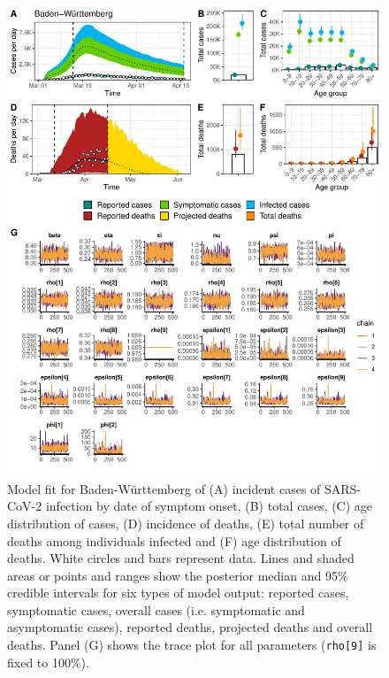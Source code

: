 \documentclass{article}
\begin{document}
\begin{figure}[h]
	\centering
	\includegraphics[width=\linewidth]{../format_output/figures_v3/supp_fit_badenw.pdf}
	\caption{Model fit for Baden-Württemberg of (A) incident cases of SARS-CoV-2 infection by date of symptom onset, (B) total cases, (C) age distribution of cases, (D) incidence of deaths, (E) total number of deaths among individuals infected and (F) age distribution of deaths. White circles and bars represent data. Lines and shaded areas or points and ranges show the posterior median and 95\% credible intervals for six types of model output: reported cases, symptomatic cases, overall cases (i.e. symptomatic and asymptomatic cases), reported deaths, projected deaths and overall deaths. Panel (G) shows the trace plot for all parameters (\texttt{rho[9]} is fixed to 100\%).}

\end{figure}
\end{document}
